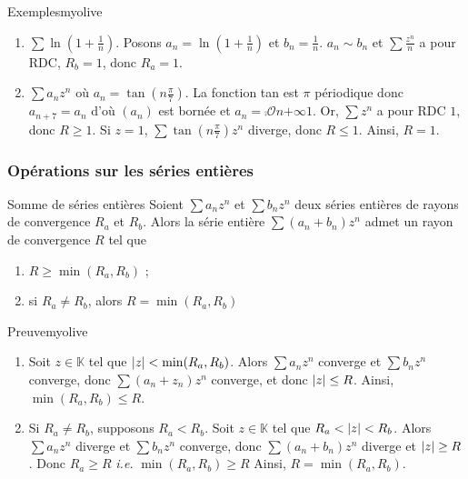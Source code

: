     \begin{omed}{Exemples}{myolive}
        \begin{enumerate}[label=\textcolor{myolive}{\arabic*.}]
            \item $\sum \ln\left(1 + \frac{1}{n}\right)$. Posons $a_n = \ln\left(1 + \frac{1}{n}\right)$ et $b_n = \frac{1}{n}$. $a_n \sim b_n$ et $\sum \frac{z^n}{n}$ a pour RDC, $R_b = 1$, donc $R_a = 1$.
            \item $\sum a_n z^n$ où $a_n = \tan\left(n \frac{\pi}{7}\right)$. La fonction tan est $\pi$ périodique donc $a_{n+7} = a_n$ d’où $(a_n)$ est bornée et $a_n = \comp{\mathcal{O}}{n}{+\infty}{1}$. Or, $\sum z^n$ a pour RDC $1$, donc $R \geq 1$. Si $z = 1$, $\sum \tan(n \frac{\pi}{7}) z^n$ diverge, donc $R \leq 1$. Ainsi, $R = 1$.
        \end{enumerate}
    \end{omed}

    \subsubsection{Opérations sur les séries entières}

    \begin{prop}{Somme de séries entières}{}
        Soient $\sum a_n z^n$ et $\sum b_n z^n$ deux séries entières de rayons de convergence $R_a$ et $R_b$. Alors la série entière $\sum (a_n + b_n) z^n$ admet un rayon de convergence $R$ tel que 
        \begin{enumerate}
            \item $R \geq \min(R_a,R_b)$ ;
            \item si $R_a \neq R_b$, alors $R = \min(R_a,R_b)$
        \end{enumerate}
    \end{prop}

    \begin{demo}{Preuve}{myolive}
        \begin{enumerate}
            \item Soit $z \in \mathbb{K}$ tel que $\left\lvert z\right\rvert < \min(R_a, R_b)$. Alors $\sum a_n z^n$ converge et $\sum b_n z^n$ converge, donc $\sum (a_n + z_n) z^n$ converge, et donc $\left\lvert z\right\rvert \leq R$. Ainsi, $\min(R_a,R_b) \leq R$. 
            \item Si $R_a \neq R_b$, supposons $R_a < R_b$. Soit $z \in \mathbb{K}$ tel que $R_a < \left\lvert z\right\rvert < R_b$. Alors $\sum a_n z^n$ diverge et $\sum b_n z^n$ converge, donc $\sum (a_n + b_n) z^n$ diverge et $\left\lvert z\right\rvert \geq R$. Donc $R_a \geq R$ \textit{i.e.} $\min(R_a,R_b) \geq R$ Ainsi, $R = \min(R_a,R_b)$.
        \end{enumerate}
        
    \end{demo}

